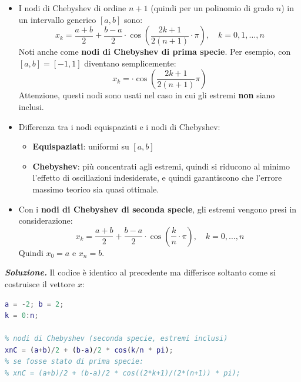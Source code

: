 \begin{enumerate}
\begin{remarkbox}
\begin{itemize}
            \item I nodi di Chebyshev di ordine $n+1$ (quindi per un polinomio di grado $n$) in un intervallo generico $\left[a,b\right]$ sono:
            \begin{equation*}
                x_{k} = \dfrac{a+b}{2} + \dfrac{b-a}{2}\cdot\cos\left(\dfrac{2k+1}{2(n+1)}\cdot\pi\right), \quad k = 0,1,\dots,n
            \end{equation*}
            Noti anche come \textbf{nodi di Chebyshev di prima specie}. Per esempio, con $\left[a,b\right] = \left[-1,1\right]$ diventano semplicemente:
            \begin{equation*}
                x_k = \cdot\cos\left(\dfrac{2k+1}{2(n+1)}\pi\right)
            \end{equation*}
            Attenzione, questi nodi sono usati nel caso in cui gli estremi \textbf{non} siano inclusi.

            \item Differenza tra i nodi equispaziati e i nodi di Chebyshev:
            \begin{itemize}
                \item \textbf{Equispaziati}: uniformi su $\left[a,b\right]$
                \item \textbf{Chebyshev}: più concentrati agli estremi, quindi si riducono al minimo l'effetto di oscillazioni indesiderate, e quindi garantiscono che l'errore massimo teorico sia quasi ottimale.
            \end{itemize}

            \item Con i \textbf{nodi di Chebyshev di seconda specie}, gli estremi vengono presi in considerazione:
            \begin{equation*}
                x_{k} = \dfrac{a+b}{2} + \frac{b-a}{2}\cdot\cos\left(\dfrac{k}{n}\cdot\pi\right), \quad k=0,\dots,n
            \end{equation*}
            Quindi $x_{0} = a$ e $x_{n} = b$.
        \end{itemize}
    \end{remarkbox}

    \textcolor{Green3}{\textbf{\emph{Soluzione.}}} Il codice è identico al precedente ma differisce soltanto come si costruisce il vettore $x$:
    \begin{lstlisting}[language=MATLAB]
% estremi intervallo
a = -2; b = 2;
k = 0:n;

% nodi di Chebyshev (seconda specie, estremi inclusi)
xnC = (a+b)/2 + (b-a)/2 * cos(k/n * pi);
% se fosse stato di prima specie:
% xnC = (a+b)/2 + (b-a)/2 * cos((2*k+1)/(2*(n+1)) * pi);


\end{lstlisting}
\end{enumerate}
